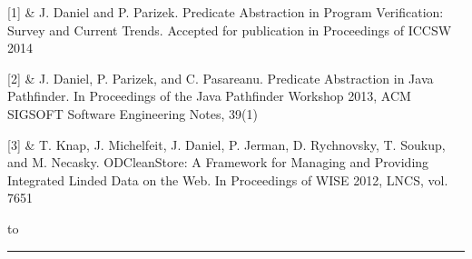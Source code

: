 {{    %
    [1] & J. Daniel and P. Parizek. Predicate Abstraction in Program Verification: Survey and Current Trends. Accepted for publication in Proceedings of ICCSW 2014 \cr
    \cr

    [2] & J. Daniel, P. Parizek, and C. Pasareanu. Predicate Abstraction in Java Pathfinder. In Proceedings of the Java Pathfinder Workshop 2013, ACM SIGSOFT Software Engineering Notes, 39(1) \cr
    \cr

    [3] & T. Knap, J. Michelfeit, J. Daniel, P. Jerman, D. Rychnovsky, T. Soukup, and M. Necasky. ODCleanStore: A Framework for Managing and Providing Integrated Linded Data on the Web. In Proceedings of WISE 2012, LNCS, vol. 7651\cr
  }
  \vsep
  \vfil
  \halign to 
  \vfil
  \vsep
  \vsep
  \vfil
  \hrule
}

\bye
